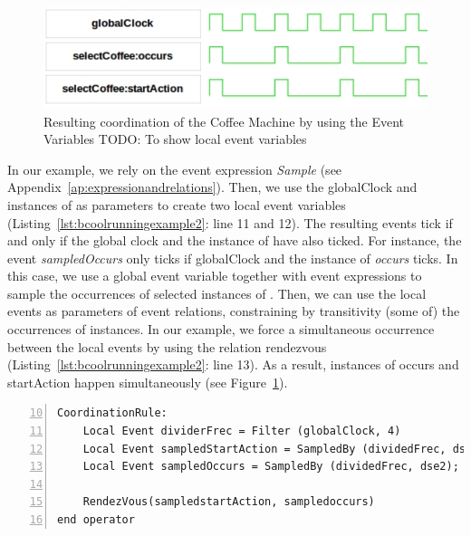 \begin{figure}[h]
	\center
	\includegraphics[width=.5\textwidth]{bcool/figs/runningeventvar}
	\caption{Resulting coordination of the Coffee Machine by using the Event Variables TODO: To show local event variables}
	\label{fig:runningeventvar}
\end{figure}

In our example, we rely on the event expression \emph{Sample} (see Appendix~\ref{ap:expressionandrelations}). Then, we use the globalClock and instances of \dse as parameters to create two local event variables (Listing~\ref{lst:bcoolrunningexample2}: line 11 and 12). The resulting events tick if and only if the global clock and the instance of \dse have also ticked. For instance, the event \emph{sampledOccurs} only ticks if globalClock and the instance of \dse \emph{occurs} ticks. In this case, we use a global event variable together with event expressions to sample the occurrences of selected instances of \dse. Then, we can use the local events as parameters of event relations, constraining by transitivity (some of) the occurrences of \dse instances. In our example, we force a simultaneous occurrence between the local events by using the relation rendezvous (Listing~\ref{lst:bcoolrunningexample2}: line 13). As a result, instances of \dse occurs and startAction happen simultaneously (see Figure~\ref{fig:runningeventvar}). 

\begin{lstlisting}[language=bcool,
caption={Synchronized product operator between the TFSM and Activity languages by using a Filter},
label={lst:bcoolrunningexample3}, 
basicstyle=\scriptsize\ttfamily, backgroundcolor=\color{LGrey}, numbers=left, firstnumber=10, xleftmargin=2pt]
CoordinationRule: 
	Local Event dividerFrec = Filter (globalClock, 4)
	Local Event sampledStartAction = SampledBy (dividedFrec, dse1);
	Local Event sampledOccurs = SampledBy (dividedFrec, dse2);

	RendezVous(sampledstartAction, sampledoccurs)
end operator
\end{lstlisting}

